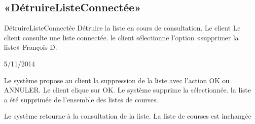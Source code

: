 \subsection[SS:DLC]{«DétruireListeConnectée»}

\startCU
\nom DétruireListeConnectée
\but Détruire la liste en cours de consultation.
\acteur Le client
\precondition Le client consulte une liste connectée.
\declenchement le client sélectionne l'option «supprimer la liste»
\auteur François D.
\date 05/11/2014

\nominal %
\startnominal
\etape Le système propose au client la suppression de la liste avec l'action OK ou ANNULER.
 Le client clique sur OK.
\etape Le système supprime la sélectionnée.
\stopnominal
\postcondition la liste a été supprimée de l'ensemble des listes de courses.


\exception 
{} 
  \etape Le système retourne à la consultation de la liste.
\stopcondition
\postcondition La liste de courses est inchangée
\stopalternatif
\stopCU
